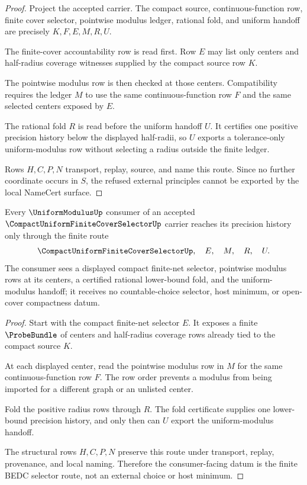 \begin{proof}
Project the accepted carrier. The compact source, continuous-function row, finite cover selector, pointwise modulus ledger, rational fold, and uniform handoff are precisely $K,F,E,M,R,U$.

The finite-cover accountability row is read first. Row $E$ may list only centers and half-radius coverage witnesses supplied by the compact source row $K$.

The pointwise modulus row is then checked at those centers. Compatibility requires the ledger $M$ to use the same continuous-function row $F$ and the same selected centers exposed by $E$.

The rational fold $R$ is read before the uniform handoff $U$. It certifies one positive precision history below the displayed half-radii, so $U$ exports a tolerance-only uniform-modulus row without selecting a radius outside the finite ledger.

Rows $H,C,P,N$ transport, replay, source, and name this route. Since no further coordinate occurs in $S$, the refused external principles cannot be exported by the local NameCert surface.
\end{proof}

\begin{theorem}
\label{thm:compact-uniform-finite-cover-selector-handoff}
Every $\UniformModulusUp$ consumer of an accepted $\CompactUniformFiniteCoverSelectorUp$ carrier reaches its precision history only through the finite route
$$
\CompactUniformFiniteCoverSelectorUp,\quad E,\quad M,\quad R,\quad U .
$$
The consumer sees a displayed compact finite-net selector, pointwise modulus rows at its centers, a certified rational lower-bound fold, and the uniform-modulus handoff; it receives no countable-choice selector, host minimum, or open-cover compactness datum.
\end{theorem}
\begin{proof}
Start with the compact finite-net selector $E$. It exposes a finite $\ProbeBundle$ of centers and half-radius coverage rows already tied to the compact source $K$.

At each displayed center, read the pointwise modulus row in $M$ for the same continuous-function row $F$. The row order prevents a modulus from being imported for a different graph or an unlisted center.

Fold the positive radius rows through $R$. The fold certificate supplies one lower-bound precision history, and only then can $U$ export the uniform-modulus handoff.

The structural rows $H,C,P,N$ preserve this route under transport, replay, provenance, and local naming. Therefore the consumer-facing datum is the finite BEDC selector route, not an external choice or host minimum.
\end{proof}

